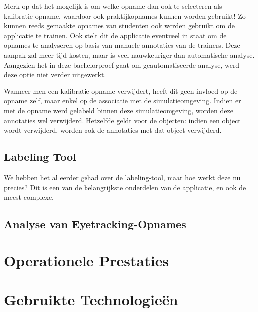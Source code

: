 Merk op dat het mogelijk is om welke opname dan ook te selecteren als kalibratie-opname, waardoor ook praktijkopnames kunnen worden gebruikt!
Zo kunnen reeds gemaakte opnames van studenten ook worden gebruikt om de applicatie te trainen.
Ook stelt dit de applicatie eventueel in staat om de opnames te analyseren op basis van manuele annotaties van de trainers.
Deze aanpak zal meer tijd kosten, maar is veel nauwkeuriger dan automatische analyse. Aangezien het in deze bachelorproef gaat om geautomatiseerde analyse, werd deze optie niet verder uitgewerkt.

Wanneer men een kalibratie-opname verwijdert, heeft dit geen invloed op de opname zelf, maar enkel op de associatie met de simulatieomgeving.
Indien er met de opname werd gelabeld binnen deze simulatieomgeving, worden deze annotaties wel verwijderd. 
Hetzelfde geldt voor de objecten: indien een object wordt verwijderd, worden ook de annotaties met dat object verwijderd.

\subsection{Labeling Tool}

We hebben het al eerder gehad over de labeling-tool, maar hoe werkt deze nu precies? Dit is een van de belangrijkste onderdelen van de applicatie, en ook de meest complexe.

\subsection{Analyse van Eyetracking-Opnames}

\section{Operationele Prestaties}

\section{Gebruikte Technologieën}